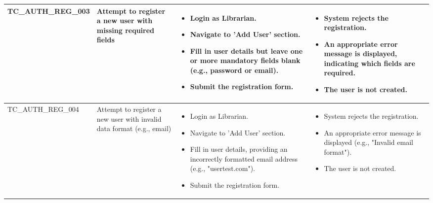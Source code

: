 \documentclass[10pt, a4paper]{report}
\begin{document}
\begin{longtable}{|>{\raggedright\arraybackslash}p{4cm}|>{\raggedright\arraybackslash}p{4cm}|>{\raggedright\arraybackslash}p{5cm}|>{\raggedright\arraybackslash}p{5cm}|}
TC\_AUTH\_REG\_003 & Attempt to register a new user with missing required fields & 
    \begin{itemize}[noitemsep, topsep=0pt, partopsep=0pt, leftmargin=*]
        \item Login as Librarian.
        \item Navigate to 'Add User' section.
        \item Fill in user details but leave one or more mandatory fields blank (e.g., password or email).
        \item Submit the registration form.
    \end{itemize} & 
    \begin{itemize}[noitemsep, topsep=0pt, partopsep=0pt, leftmargin=*]
        \item System rejects the registration.
        \item An appropriate error message is displayed, indicating which fields are required.
        \item The user is not created.
    \end{itemize} \\ \hline
TC\_AUTH\_REG\_004 & Attempt to register a new user with invalid data format (e.g., email) & 
    \begin{itemize}[noitemsep, topsep=0pt, partopsep=0pt, leftmargin=*]
        \item Login as Librarian.
        \item Navigate to 'Add User' section.
        \item Fill in user details, providing an incorrectly formatted email address (e.g., "usertest.com").
        \item Submit the registration form.
    \end{itemize} & 
    \begin{itemize}[noitemsep, topsep=0pt, partopsep=0pt, leftmargin=*]
        \item System rejects the registration.
        \item An appropriate error message is displayed (e.g., "Invalid email format").
        \item The user is not created.
    \end{itemize} \\ \hline


\end{longtable}
\end{document}
